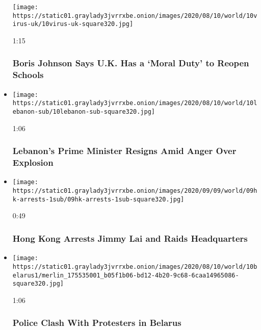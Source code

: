 \begin{itemize}
  \texttt{[image: https://static01.graylady3jvrrxbe.onion/images/2020/08/10/world/10virus-uk/10virus-uk-square320.jpg]}

  1:15

  \hypertarget{boris-johnson-says-uk-has-a-moral-duty-to-reopen-schools}{%
  \subsubsection{Boris Johnson Says U.K. Has a `Moral Duty' to Reopen
  Schools}\label{boris-johnson-says-uk-has-a-moral-duty-to-reopen-schools}}
\item
  \href{https://www.nytimes3xbfgragh.onion/video/us/politics/100000007282089/lebanon-prime-minister-resigns-explosion.html?action=click\&module=video-series-bar\&region=header\&pgtype=Article\&playlistId=video/world}{}

  \texttt{[image: https://static01.graylady3jvrrxbe.onion/images/2020/08/10/world/10lebanon-sub/10lebanon-sub-square320.jpg]}

  1:06

  \hypertarget{lebanons-prime-minister-resigns-amid-anger-over-explosion}{%
  \subsubsection{Lebanon's Prime Minister Resigns Amid Anger Over
  Explosion}\label{lebanons-prime-minister-resigns-amid-anger-over-explosion}}
\item
  \href{https://www.nytimes3xbfgragh.onion/video/us/100000007281530/hong-kong-arrests-jimmy-lai.html?action=click\&module=video-series-bar\&region=header\&pgtype=Article\&playlistId=video/world}{}

  \texttt{[image: https://static01.graylady3jvrrxbe.onion/images/2020/09/09/world/09hk-arrests-1sub/09hk-arrests-1sub-square320.jpg]}

  0:49

  \hypertarget{hong-kong-arrests-jimmy-lai-and-raids-headquarters}{%
  \subsubsection{Hong Kong Arrests Jimmy Lai and Raids
  Headquarters}\label{hong-kong-arrests-jimmy-lai-and-raids-headquarters}}
\item
  \href{https://www.nytimes3xbfgragh.onion/video/world/100000007281204/belarus-election-protests.html?action=click\&module=video-series-bar\&region=header\&pgtype=Article\&playlistId=video/world}{}

  \texttt{[image: https://static01.graylady3jvrrxbe.onion/images/2020/08/10/world/10belarus1/merlin\_175535001\_b05f1b06-bd12-4b20-9c68-6caa14965086-square320.jpg]}

  1:06

  \hypertarget{police-clash-with-protesters-in-belarus}{%
  \subsubsection{Police Clash With Protesters in
  Belarus}\label{police-clash-with-protesters-in-belarus}}
\end{itemize}

